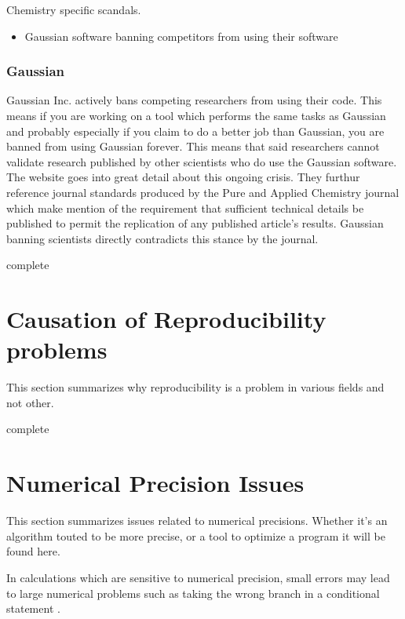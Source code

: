\documentclass[american]{article}
\newcommand{\complete}{
	\gls{complete}
}
\begin{document}
Chemistry specific scandals.

\begin{itemize}
\item Gaussian software banning competitors from using their software
\end{itemize}

\subsubsection{Gaussian} \label{sec:scanals-chemistry-gaussian}

Gaussian Inc. actively bans competing researchers from using their code. This means if you are working on a tool which performs the same tasks as Gaussian and probably especially if you claim to do a better job than Gaussian, you are banned from using Gaussian forever. This means that said researchers cannot validate research published by other scientists who do use the Gaussian software. The website \cite{banned-by-gaussian} goes into great detail about this ongoing crisis. They furthur reference journal standards produced by the Pure and Applied Chemistry journal \cite{pac-guidelines-publication-1998,pac-guidelines-presentation-1998} which make mention of the requirement that sufficient technical details be published to permit the replication of any published article's results. Gaussian banning scientists directly contradicts this stance by the journal.

\complete

\section{Causation of Reproducibility problems} \label{sec:causation}

This section summarizes why reproducibility is a problem in various fields and not other.
\complete

\section{Numerical Precision Issues} \label{sec:precision}

This section summarizes issues related to numerical precisions. Whether it's an algorithm touted to be more precise, or a tool to optimize a program it will be found here.

In calculations which are sensitive to numerical precision, small errors may lead to large numerical problems such as taking the wrong branch in a conditional statement \cite{high-precision-arith-in-science}.
\end{document}
